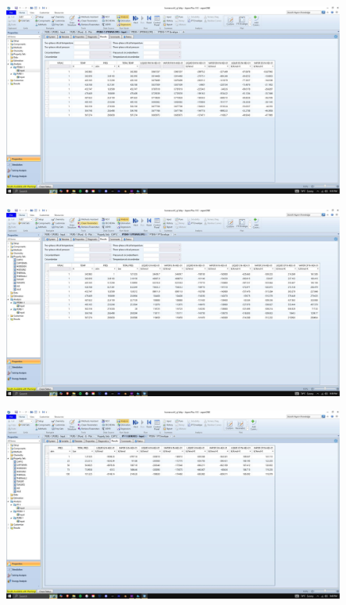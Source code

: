 \documentclass{article}
\begin{document}
\begin{figure}[H]
    \centering
    \includegraphics[width=0.99\textwidth, frame]{img/10.JPG}
\end{figure}

\begin{figure}[H]
    \centering
    \includegraphics[width=0.99\textwidth, frame]{img/11.JPG}
\end{figure}

\begin{figure}[H]
    \centering
    \includegraphics[width=0.99\textwidth, frame]{img/12.JPG}
\end{figure}
\end{document}
